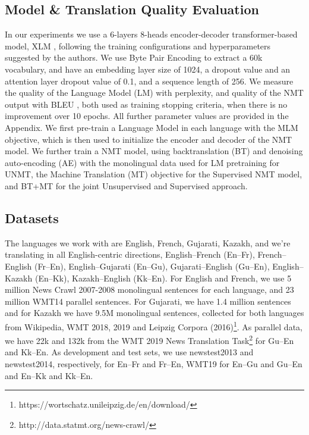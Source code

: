 \documentclass[11pt]{article}
\begin{document}
\subsection{Model \& Translation Quality Evaluation}
In our experiments we use a 6-layers 8-heads encoder-decoder transformer-based model, XLM \citep{lample2019cross}, following the training configurations and hyperparameters suggested by the authors. We use Byte Pair Encoding \citep{sennrich-etal-2016-neural} to extract a 60k vocabulary, and have an embedding layer size of 1024, a dropout value and an attention layer dropout value of 0.1, and a sequence length of 256. We measure the quality of the Language Model (LM) with perplexity, and quality of the NMT output with BLEU \citep{papineni2002bleu}, both used as training stopping criteria, when there is no improvement over 10 epochs. All further parameter values are provided in the Appendix.
We first pre-train a Language Model in each language with the MLM objective, which is then used to initialize the encoder and decoder of the NMT model. We further train a NMT model, 
using backtranslation (BT) and denoising auto-encoding (AE) with the monolingual data used for LM pretraining for UNMT, the Machine Translation (MT) objective for the Supervised NMT model, and BT+MT for the joint Unsupervised and Supervised approach. 


\subsection{Datasets}
The languages we work with are English, French, Gujarati, Kazakh, and we're translating in all English-centric directions, English--French (En--Fr), French--English (Fr--En), English--Gujarati (En--Gu), Gujarati--English (Gu--En), English--Kazakh (En--Kk), Kazakh--English (Kk--En). For English and French, we use 5 million News Crawl 2007-2008 monolingual sentences for each language, and 23 million WMT14 parallel sentences. 
For Gujarati, we have 1.4 million sentences and for Kazakh we have 9.5M monolingual sentences, collected for both languages from Wikipedia, WMT 2018, 2019 and Leipzig Corpora (2016)\footnote{https://wortschatz.unileipzig.de/en/download/}. %
As parallel data, we have 22k and 132k from the WMT 2019 News Translation Task\footnote{http://data.statmt.org/news-crawl/} for Gu--En and Kk--En.%
As development and test sets, we use newstest2013 and newstest2014, respectively, for En--Fr and Fr--En, WMT19 for En--Gu and Gu--En and En--Kk and Kk--En.%
\end{document}
